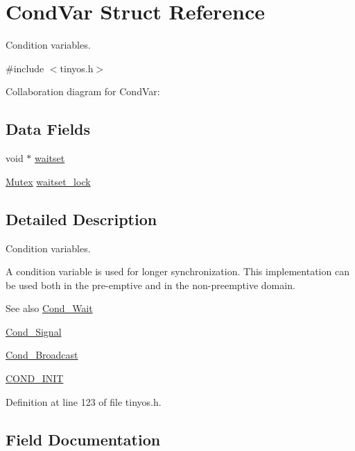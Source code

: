 \hypertarget{structCondVar}{}\section{Cond\+Var Struct Reference}
\label{structCondVar}


Condition variables.  




{\ttfamily \#include $<$tinyos.\+h$>$}



Collaboration diagram for Cond\+Var\+:
\subsection*{Data Fields}
\begin{DoxyCompactItemize}
\item 
void $\ast$ \hyperlink{structCondVar_a7da9e0169713c3b3ae386a8ab49f7e34}{waitset}
\item 
\hyperlink{group__syscalls_gaef2ec62cae8e0031fd19fc8b91083ade}{Mutex} \hyperlink{structCondVar_a477b855f4d3880d231206ae79bd5b6cf}{waitset\+\_\+lock}
\end{DoxyCompactItemize}


\subsection{Detailed Description}
Condition variables. 

A condition variable is used for longer synchronization. This implementation can be used both in the pre-\/emptive and in the non-\/preemptive domain.

\begin{DoxySeeAlso}{See also}
\hyperlink{group__syscalls_ga970dca2210b3f2ec8aedab7f542a9bf4}{Cond\+\_\+\+Wait} 

\hyperlink{group__syscalls_ga43f64f8be273d2fe77d7de5f4b81e22d}{Cond\+\_\+\+Signal} 

\hyperlink{group__syscalls_ga8196aa2a48cad90742f254cc3b8fd351}{Cond\+\_\+\+Broadcast} 

\hyperlink{group__syscalls_ga6a7055a466bff255172e05f6ec82d792}{C\+O\+N\+D\+\_\+\+I\+N\+IT} 
\end{DoxySeeAlso}


Definition at line 123 of file tinyos.\+h.



\subsection{Field Documentation}
\mbox{\label{structCondVar_a7da9e0169713c3b3ae386a8ab49f7e34}} 
